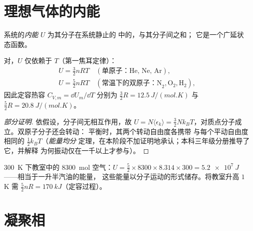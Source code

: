 \section{理想气体的内能}

\begin{definition}[内能]\label{def:b1:kinetic-theory:U}
系统的\emph{内能} $U$ 为其分子在系统静止的
中的，与其分子间之和；
它是一个广延状态函数。
\end{definition}

\begin{proposition}[理想气体的内能]\label{prop:b1:kinetic-theory:Ugas}
对，$U$ 仅依赖于 $T$（第一焦耳定律）：
\begin{gather*}
U = \tfrac32 nRT \quad (\text{单原子：He, Ne, Ar}), \\
U = \tfrac52 nRT \quad (\text{常温下的双原子：N}_2, \text{O}_2, \text{H}_2),
\end{gather*}
因此定容热容 $C_{V,m} = \dd U_m/\dd T$
分别为 $\tfrac32 R = \qty{12.5}{J/(mol.K)}$ 与
$\tfrac52 R = \qty{20.8}{J/(mol.K)}$。
\end{proposition}

\begin{proof}[部分证明]
依假设，分子间无相互作用，故 $U = N\langle\epsilon_k\rangle
= \tfrac32 Nk_BT$，对质点分子成立。双原子分子还会转动：
平衡时，其两个转动自由度各携带
与每个平动自由度相同的 $\tfrac12 k_BT$（\emph{能量均分}
定理，在本阶段不加证明地承认；本科三年级分册推导了它，并解释
为何振动仅在一千以上才参与）。
\end{proof}

\begin{example}[一间教室的能量]\label{ex:b1:kinetic-theory:room}
\qty{300}{K} 下教室中的 \qty{8300}{mol} 空气：$U = \tfrac52 \times
8300 \times 8.314 \times 300 = \qty{5.2e7}{J}$——相当于一升半汽油的能量，
这些能量以分子运动的形式储存。将教室升高 $1$ K
需 $\tfrac52 nR = \qty{170}{kJ}$（定容过程）。
\end{example}

\section{凝聚相}

